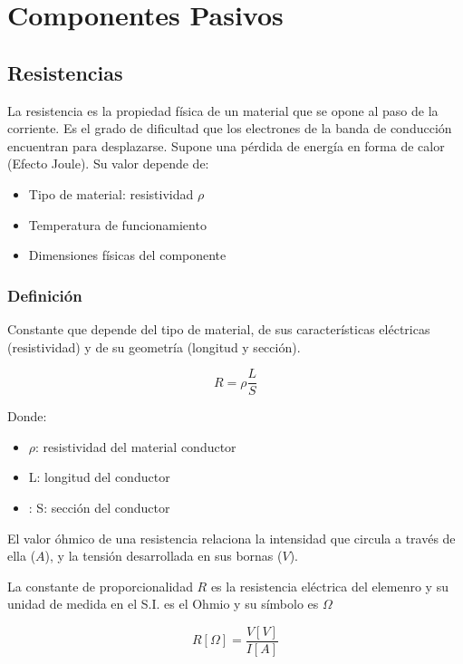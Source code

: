 \chapter{Componentes Pasivos}

\section{Resistencias}

La resistencia es la propiedad física de un material que se opone al paso de la corriente. Es el grado de dificultad que los electrones de la banda de conducción encuentran para desplazarse. Supone una pérdida de energía en forma de calor (Efecto Joule). Su valor depende de:

\begin{itemize}
    \item Tipo de material: resistividad \(\rho\)
    \item Temperatura de funcionamiento
    \item Dimensiones físicas del componente
\end{itemize}

\subsection{Definición}
Constante que depende del tipo de material, de sus características eléctricas (resistividad) y de su geometría (longitud y sección).

\begin{equation}
    R = \rho \frac{L}{S}
\end{equation}

Donde:
\begin{itemize}
    \item \(\rho\): resistividad del material conductor
    \item L: longitud del conductor
    \item: S: sección del conductor
\end{itemize}

El valor óhmico de una resistencia relaciona la intensidad que circula a través de ella ($A$), y la tensión desarrollada en sus bornas ($V$).

La constante de proporcionalidad $R$ es la resistencia eléctrica del elemenro y su unidad de medida en el S.I. es el Ohmio y su símbolo es $\Omega$

\begin{equation}
    R[\Omega] = \frac{V[V]}{I[A]}
\end{equation}

